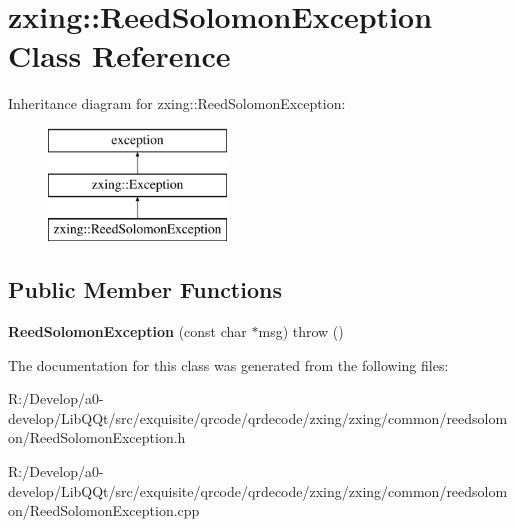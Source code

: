 \hypertarget{classzxing_1_1_reed_solomon_exception}{}\section{zxing\+:\+:Reed\+Solomon\+Exception Class Reference}
\label{classzxing_1_1_reed_solomon_exception}
Inheritance diagram for zxing\+:\+:Reed\+Solomon\+Exception\+:\begin{figure}[H]
\begin{center}
\leavevmode
\includegraphics[height=3.000000cm]{classzxing_1_1_reed_solomon_exception}
\end{center}
\end{figure}
\subsection*{Public Member Functions}
\begin{DoxyCompactItemize}
\item 
\mbox{\label{classzxing_1_1_reed_solomon_exception_ac7e9cc92b372b929a86dd34e3aa76e7b}} 
{\bfseries Reed\+Solomon\+Exception} (const char $\ast$msg)  throw ()
\end{DoxyCompactItemize}


The documentation for this class was generated from the following files\+:\begin{DoxyCompactItemize}
\item 
R\+:/\+Develop/a0-\/develop/\+Lib\+Q\+Qt/src/exquisite/qrcode/qrdecode/zxing/zxing/common/reedsolomon/Reed\+Solomon\+Exception.\+h\item 
R\+:/\+Develop/a0-\/develop/\+Lib\+Q\+Qt/src/exquisite/qrcode/qrdecode/zxing/zxing/common/reedsolomon/Reed\+Solomon\+Exception.\+cpp\end{DoxyCompactItemize}
